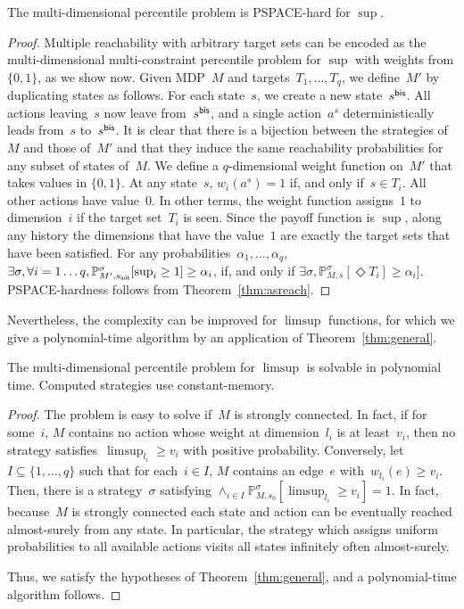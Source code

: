 \documentclass{llncs}
\newcommand{\initState}{\ensuremath{s_{{\sf init}}} }
\newcommand*{\pr}{\mathbb{P}}
\newcommand\PSPACE{\textrm{\sf PSPACE}}
\newcommand\bis{\ensuremath{\textrm{\sf bis}}}
\begin{document}
\begin{theorem}
\label{thm:quant_reg_multi_dim_pspace}
  The multi-dimensional percentile problem is \PSPACE-hard for $\sup$.
\end{theorem}
\begin{proof}
  Multiple reachability with arbitrary target sets can be encoded as the multi-dimensional multi-constraint percentile problem for $\sup$ with weights from $\{0,1\}$, as we show now.
  Given MDP~$M$ and targets~$T_1,\ldots,T_q$, we define~$M'$ by duplicating states as follows.
  For each state~$s$, we create a new state~$s^\bis$. All actions leaving~$s$ now leave from~$s^\bis$,
  and a single action~$a^s$ deterministically leads from~$s$ to~$s^\bis$.
  It is clear that there is a bijection between the strategies of~$M$ and those of~$M'$ and that they induce the same reachability probabilities for any subset of states of~$M$.
  We define a $q$-dimensional weight function on~$M'$ that takes values in $\{0,1\}$. At any state~$s$, 
  $w_i(a^s) = 1$ if, and only if~$s \in T_i$. All other actions have value~$0$.
  In other terms, the weight function assigns~$1$ to dimension~$i$ if the target set~$T_i$ is seen. Since the payoff function is $\sup$, along any history
  the dimensions that have the value~$1$ are exactly the target sets that have been satisfied.
  For any probabilities~$\alpha_1,\ldots,\alpha_q$, $\exists \sigma, \forall i=1\ldots q, \pr_{M',\initState}^\sigma[\sup_i\geq 1]\geq \alpha_i$,
  if, and only if $\exists \sigma, \pr_{M,s}^\sigma[\Diamond T_i]\geq \alpha_i]$.
  \PSPACE-hardness follows from Theorem~\ref{thm:asreach}.
\end{proof}

Nevertheless, the complexity can be improved for $\limsup$ functions, for which we give a polynomial-time algorithm by an application of Theorem~\ref{thm:general}.

\begin{theorem}
  \label{lemma:limsup}
  The multi-dimensional percentile problem for $\limsup$ is solvable in polynomial time.
  Computed strategies use constant-memory.
\end{theorem}

\begin{proof}
  The problem is easy to solve if~$M$ is strongly connected.
  In fact, if for some~$i$, $M$ contains no action whose weight at dimension~$l_i$ is at least~$v_i$, 
  then no strategy satisfies~$\limsup_{l_i} \geq v_i$ with positive probability. Conversely, let~$I \subseteq \{1,\ldots,q\}$ such that for each~$i \in I$,
  $M$ contains an edge~$e$ with~$w_{l_i} (e) \geq v_i$. Then, there is a strategy~$\sigma$ satisfying
  $\wedge_{i \in I} \pr_{M,s_0}^\sigma[ \limsup_{l_i} \geq v_i ] = 1$. In fact, because~$M$ is strongly connected
  each state and action can be eventually reached almost-surely from any state. 
  In particular, the strategy which assigns uniform probabilities to all available actions visits all states infinitely often almost-surely.
  
  Thus, we satisfy the hypotheses of Theorem~\ref{thm:general}, and a polynomial-time algorithm follows.
\end{proof}
\end{document}
